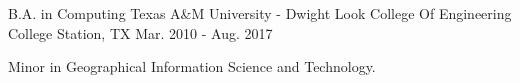 

\begin{cventries}

  \cventry
    {B.A. in Computing} %
    {Texas A\&M University - Dwight Look College Of Engineering} %
    {College Station, TX} %
    {Mar. 2010 - Aug. 2017} %
    {
      \begin{cvitems} %
        \item {Minor in Geographical Information Science and Technology.}
      \end{cvitems}
    }

\end{cventries}

